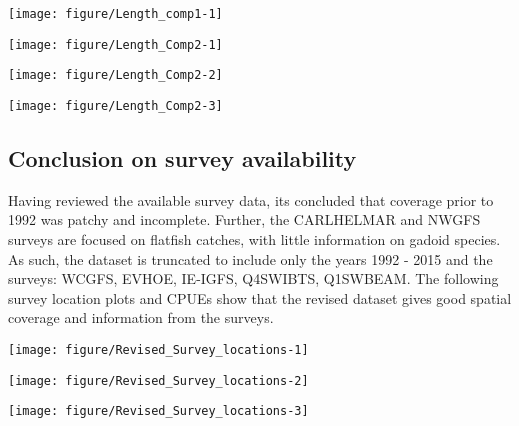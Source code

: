 \documentclass[12pt]{article}\usepackage[]{graphicx}\usepackage[]{color}
\newenvironment{knitrout}{}{} %
\begin{document}
\begin{landscape}

\begin{knitrout}\footnotesize
{}\color{fgcolor}
\texttt{[image: figure/Length\_comp1-1]} 

\end{knitrout}

\begin{knitrout}\footnotesize
{}\color{fgcolor}
\texttt{[image: figure/Length\_Comp2-1]} 

\texttt{[image: figure/Length\_Comp2-2]} 

\texttt{[image: figure/Length\_Comp2-3]} 

\end{knitrout}

\end{landscape}

\subsection{Conclusion on survey availability}

Having reviewed the available survey data, its concluded that coverage prior to
1992 was patchy and incomplete. Further, the CARLHELMAR and NWGFS surveys are
focused on flatfish catches, with little information on gadoid species. As
such, the dataset is truncated to include only the years 1992 - 2015 and the
surveys: WCGFS, EVHOE, IE-IGFS, Q4SWIBTS, Q1SWBEAM. The following survey
location plots and CPUEs show that the revised dataset gives good spatial
coverage and information from the surveys. \\

\begin{landscape}

\begin{knitrout}\footnotesize
{}\color{fgcolor}
\texttt{[image: figure/Revised\_Survey\_locations-1]} 

\texttt{[image: figure/Revised\_Survey\_locations-2]} 

\texttt{[image: figure/Revised\_Survey\_locations-3]} 

\end{knitrout}

\end{landscape}
\end{document}
